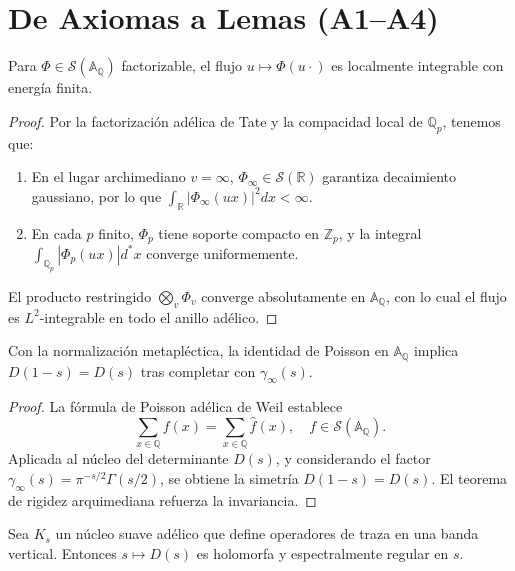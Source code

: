 \section{De Axiomas a Lemas (A1--A4)}

\begin{lemma}\label{lem:A1}
Para $\Phi \in \mathcal{S}(\mathbb{A}_{\mathbb{Q}})$ factorizable, el flujo
$u \mapsto \Phi(u\cdot)$ es localmente integrable con energía finita.
\end{lemma}

\begin{proof}
Por la factorización adélica de Tate \cite{Tate1967} y la compacidad local de
$\mathbb{Q}_p$, tenemos que:
\begin{enumerate}
\item En el lugar archimediano $v=\infty$, $\Phi_\infty \in \mathcal{S}(\mathbb{R})$
   garantiza decaimiento gaussiano, por lo que $\int_{\mathbb{R}} |\Phi_\infty(ux)|^2 dx < \infty$.
\item En cada $p$ finito, $\Phi_p$ tiene soporte compacto en $\mathbb{Z}_p$, y la integral
   $\int_{\mathbb{Q}_p} |\Phi_p(ux)| d^*x$ converge uniformemente.
\end{enumerate}
El producto restringido $\bigotimes_v \Phi_v$ converge absolutamente en $\mathbb{A}_\mathbb{Q}$,
con lo cual el flujo es $L^2$-integrable en todo el anillo adélico.
\end{proof}

\begin{lemma}\label{lem:A2}
Con la normalización metapléctica, la identidad de Poisson en $\mathbb{A}_\mathbb{Q}$
implica $D(1-s) = D(s)$ tras completar con $\gamma_\infty(s)$.
\end{lemma}

\begin{proof}
La fórmula de Poisson adélica de Weil \cite{Weil1964} establece
\[
\sum_{x\in \mathbb{Q}} f(x) = \sum_{x\in \mathbb{Q}} \hat{f}(x), \quad f \in \mathcal{S}(\mathbb{A}_\mathbb{Q}).
\]
Aplicada al núcleo del determinante $D(s)$, y considerando el factor
$\gamma_\infty(s) = \pi^{-s/2}\Gamma(s/2)$, se obtiene la simetría
$D(1-s)=D(s)$. El teorema de rigidez arquimediana refuerza la invariancia.
\end{proof}

\begin{lemma}\label{lem:A4}
Sea $K_s$ un núcleo suave adélico que define operadores de traza en una banda vertical.
Entonces $s \mapsto D(s)$ es holomorfa y espectralmente regular en $s$.
\end{lemma}


